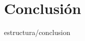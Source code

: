 \documentclass[epsbased,lof,loe,copyright,final,printable,covers,extendedindex,firstnumbered,tfg,gnuplot]{tfgtfmthesisuam}
\begin{document}
\chapter{Conclusión\label{CAP:CONCLUSION}}{estructura/conclusion}
%


%
%
%
%
%
\end{document}

